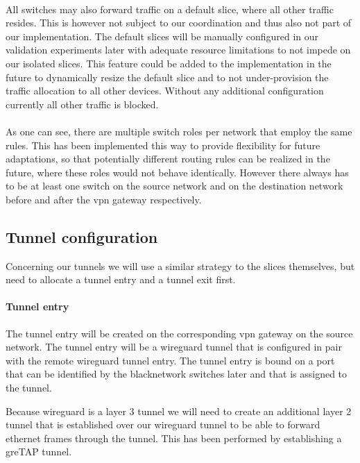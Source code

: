 \paragraph{} All switches may also forward traffic on a default slice, where all other traffic resides. This is however not subject to our coordination and thus also not part of our implementation. The default slices will be manually configured in our validation experiments later with adequate resource limitations to not impede on our isolated slices. This feature could be added to the implementation in the future to dynamically resize the default slice and to not under-provision the traffic allocation to all other devices. Without any additional configuration currently all other traffic is blocked.

\paragraph{} As one can see, there are multiple switch roles per network that employ the same rules. This has been implemented this way to provide flexibility for future adaptations, so that potentially different routing rules can be realized in the future, where these roles would not behave identically. However there always has to be at least one switch on the source network and on the destination network before and after the \acrshort{vpn} gateway respectively.

\subsection{Tunnel configuration}
\label{impl_tunnel_config}
Concerning our tunnels we will use a similar strategy to the slices themselves, but need to allocate a tunnel entry and a tunnel exit first.

\paragraph{Tunnel entry} The tunnel entry will be created on the corresponding \acrshort{vpn} gateway on the source network. The tunnel entry will be a \gls{wireguard} tunnel that is configured in pair with the remote \gls{wireguard} tunnel entry. The tunnel entry is bound on a port that can be identified by the \gls{blacknetwork} switches later and that is assigned to the tunnel.

Because \gls{wireguard} is a layer 3 tunnel we will need to create an additional layer 2 tunnel that is established over our \gls{wireguard} tunnel to be able to forward ethernet frames through the tunnel. This has been performed by establishing a \acrshort{gre}TAP tunnel.

